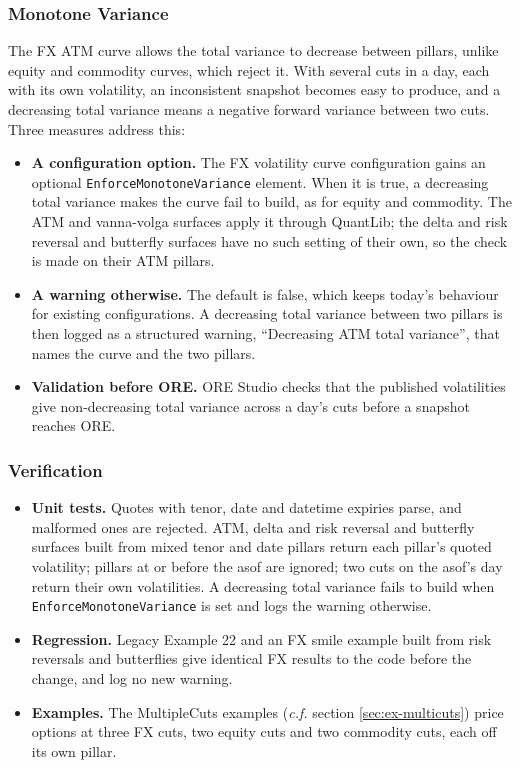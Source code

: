 \documentclass[12pt, a4paper]{article}
\begin{document}
\subsubsection*{Monotone Variance}

The FX ATM curve allows the total variance to decrease between pillars, unlike equity and commodity curves, which
reject it. With several cuts in a day, each with its own volatility, an inconsistent snapshot becomes easy to produce,
and a decreasing total variance means a negative forward variance between two cuts. Three measures address this:

\begin{itemize}
\item \textbf{A configuration option.} The FX volatility curve configuration gains an optional
  \texttt{EnforceMonotoneVariance} element. When it is true, a decreasing total variance makes the curve fail to build,
  as for equity and commodity. The ATM and vanna-volga surfaces apply it through QuantLib; the delta and risk reversal
  and butterfly surfaces have no such setting of their own, so the check is made on their ATM pillars.
\item \textbf{A warning otherwise.} The default is false, which keeps today's behaviour for existing configurations. A
  decreasing total variance between two pillars is then logged as a structured warning, ``Decreasing ATM total
  variance'', that names the curve and the two pillars.
\item \textbf{Validation before ORE.} ORE Studio checks that the published volatilities give non-decreasing total
  variance across a day's cuts before a snapshot reaches ORE.
\end{itemize}

\subsubsection*{Verification}

\begin{itemize}
\item \textbf{Unit tests.} Quotes with tenor, date and datetime expiries parse, and malformed ones are rejected. ATM,
  delta and risk reversal and butterfly surfaces built from mixed tenor and date pillars return each pillar's quoted
  volatility; pillars at or before the asof are ignored; two cuts on the asof's day return their own volatilities. A
  decreasing total variance fails to build when \texttt{EnforceMonotoneVariance} is set and logs the warning otherwise.
\item \textbf{Regression.} Legacy Example 22 and an FX smile example built from risk reversals and butterflies give
  identical FX results to the code before the change, and log no new warning.
\item \textbf{Examples.} The MultipleCuts examples (\textit{c.f.} section \ref{sec:ex-multicuts}) price options at three FX
  cuts, two equity cuts and two commodity cuts, each off its own pillar.
\end{itemize}
\end{document}
